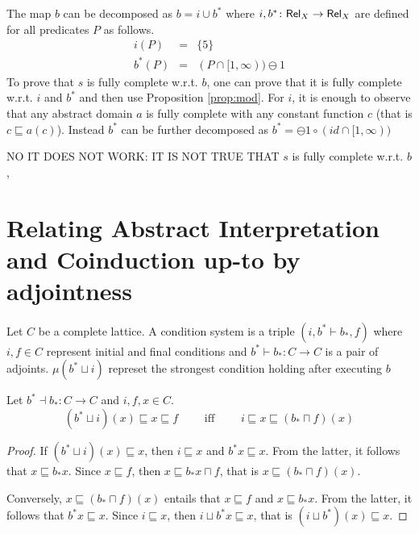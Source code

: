 \documentclass{llncs}
\begin{document}
The map $b$ can be decomposed as $b=i \cup b^*$ where $i,b^* \colon \mathsf{Rel}_X\to  \mathsf{Rel}_X$ are defined for all predicates $P$ as follows.
\begin{equation}
\begin{array}{rcl}
i(P) & = & \{ 5 \}\\
b^*(P) & =& (P\cap [1,\infty) ) \ominus\! 1 
\end{array}
\end{equation}
To prove that $s$ is fully complete w.r.t. $b$, one can prove that it is fully complete w.r.t. $i$ and $b^*$ and then use Proposition \ref{prop:mod}. For $i$, it is enough to observe that any abstract domain $a$ is fully complete with any constant function $c$ (that is $c\sqsubseteq a(c)$). Instead $b^*$ can be further decomposed as $b^*= \ominus\!1 \circ (id\cap [1,\infty)) $

NO IT DOES NOT WORK: IT IS NOT TRUE THAT $s$ is fully complete w.r.t. $b$,

\section{Relating Abstract Interpretation and Coinduction up-to by adjointness}

Let $C$ be a complete lattice.
A condition system is a triple $(i,b^*\vdash b_*,f)$ where $i,f\in C$ represent initial and final conditions and $b^*\vdash b_*\colon C \to C$ is a pair of adjoints.
$\mu (b^*\sqcup i)$ represet the strongest condition holding after executing $b$


\begin{proposition}\label{prop:correspondencefixedpoints}Let $b^* \dashv b_* \colon C \to C$ and $i,f,x\in C$. 
$$(b^*\sqcup i)(x) \sqsubseteq x \sqsubseteq f \qquad \text{ iff } \qquad 
i \sqsubseteq x \sqsubseteq (b_*\sqcap f) (x)$$
\end{proposition}
\begin{proof}
If $(b^*\sqcup i)(x) \sqsubseteq x$, then $ i \sqsubseteq x$ and $b^*x\sqsubseteq x$. From the latter, it follows that $x\sqsubseteq b_* x$. 
%
Since $x\sqsubseteq f$, then  $x\sqsubseteq b_* x \sqcap f$, that is $x\sqsubseteq (b_* \sqcap f)(x)$.

Conversely, $x \sqsubseteq (b_*\sqcap f)(x)$ entails that $x\sqsubseteq f$ and $x \sqsubseteq b_*x$. From the latter, it follows that $b^*x\sqsubseteq x$. 
%
Since $i\sqsubseteq x$, then $i\sqcup b^*x \sqsubseteq x$, that is $(i \sqcup b^*)(x) \sqsubseteq x$.
\end{proof}
\end{document}
